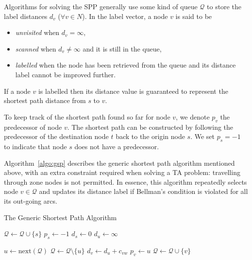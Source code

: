 Algorithms for solving the SPP generally use some kind of queue $\mathcal{Q}$ to store the label distances $d_v$ ($\forall v \in N$).
In the label vector,
a node $v$ is said to be 
\begin{itemize}
    \item \emph{unvisited} when $d_v = \infty$,
    \item \emph{scanned} when $d_v \neq \infty$ and it is still in the queue,
    \item \emph{labelled} when the node has been retrieved from the queue and its distance label cannot be improved further.
\end{itemize}
If a node $v$ is labelled then its distance value is guaranteed to represent the shortest path distance from $s$ to $v$.

To keep track of the shortest path found so far for node $v$,
we denote $p_v$ the predecessor of node $v$.
The shortest path can be constructed by following the predecessor of the destination node $t$ back to the origin node $s$.
We set $p_s = -1$ to indicate that node $s$ does not have a predecessor.

Algorithm~\ref{algo:gsp} \citep{Klunder} describes the generic shortest path algorithm mentioned above,
with an extra constraint required when solving a TA problem: travelling through zone nodes is not permitted.
In essence, this algorithm repeatedly selects node $v \in \mathcal{Q}$ and 
updates its distance label if Bellman's condition is violated for all its out-going arcs.

\begin{algorithm}
    \caption{The Generic Shortest Path Algorithm}
    \label{algo:gsp}
    \begin{algorithmic}[1]
        \State $\mathcal{Q} \gets \mathcal{Q} \cup \{s\}$ 
        \State $p_s \gets -1$ 
        \State $d_s \gets 0$
         
        \State $d_u \gets \infty$
    \EndFor

    \State $ u \gets \text{next}(\mathcal{Q}) $ 
    \State $ \mathcal{Q} \gets \mathcal{Q} \setminus \{u\} $
     
    \State $d_v \gets d_u + c_{vw}$
    \State $p_v \gets u$
    \State $\mathcal{Q} \gets \mathcal{Q} \cup \{v\}$ 
\EndIf
                    \EndIf
                \EndFor
            \EndIf
        \EndWhile
    \EndProcedure
\end{algorithmic}
\end{algorithm}

